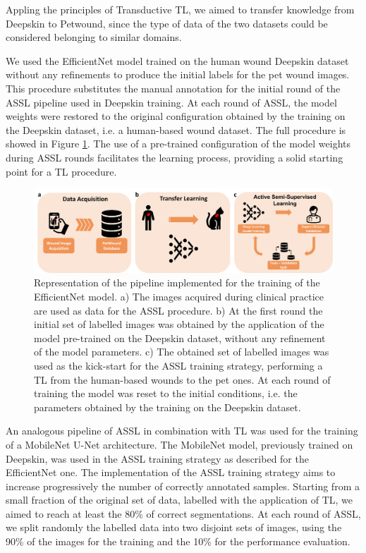 \documentclass[../main.tex]{subfiles}
\begin{document}
Appling the principles of Transductive TL, we aimed to transfer knowledge from Deepskin to Petwound, since the type of data of the two datasets could be considered belonging to similar domains.

We used the EfficientNet model trained on the human wound Deepskin dataset without any refinements to produce the initial labels for the pet wound images. 
This procedure substitutes the manual annotation for the initial round of the ASSL pipeline used in Deepskin training.
At each round of ASSL, the model weights were restored to the original configuration obtained by the training on the Deepskin dataset, i.e. a human-based wound dataset.
The full procedure is showed in Figure \ref{fig:TASSL}.
The use of a pre-trained configuration of the model weights during ASSL rounds facilitates the learning process, providing a solid starting point for a TL procedure. 

\begin{figure}[H] 
\begin{center}
\includegraphics[width=16cm]{images/TASSL.png}
\caption{\small{Representation of the pipeline implemented for the training of the EfficientNet model.
a) The images acquired during clinical practice are used as data for the ASSL procedure.
b) At the first round the initial set of labelled images was obtained by the application of the model pre-trained on the Deepskin dataset, without any refinement of the model parameters.
c) The obtained set of labelled images was used as the kick-start for the ASSL training strategy, performing a TL from the human-based wounds to the pet ones. 
At each round of training the model was reset to the initial conditions, i.e. the parameters obtained by the training on the Deepskin dataset.}}\label{fig:TASSL}
\end{center}
\end{figure}
An analogous pipeline of ASSL in combination with TL was used for the training of a MobileNet U-Net architecture. 
The MobileNet model, previously trained on Deepskin, was used in the ASSL training strategy as described for the EfficientNet one. 
The implementation of the ASSL training strategy aims to increase progressively the number of correctly annotated samples.
Starting from a small fraction  of the original set of data, labelled with the application of TL, we aimed to reach at least the 80\% of correct segmentations. 
At each round of ASSL, we split randomly the labelled data into two disjoint sets of images, using the 90\% of the images for the training and the 10\% for the performance evaluation.
\end{document}
